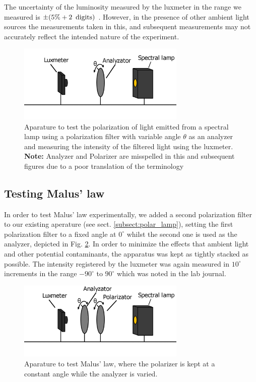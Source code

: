 \documentclass[11pt,a4paper, twocolumn]{article}
\begin{document}
    The uncertainty of the luminosity measured by the luxmeter in the range we measured is $\pm (5\% + 2\enspace \textup{digits})$ \cite{data:luxmeter}. However, in the presence of other ambient light sources the measurements taken in this, and subsequent measurements may not accurately reflect the intended nature of the experiment.


  \begin{figure}[H]
    \center
    \includegraphics[width=8cm]{scripts/figs/diagram_1.png}
    \caption{Aparature to test the polarization of light emitted from a spectral lamp using a polarization filter with variable angle $\theta$ as an analyzer and measuring the intensity of the filtered light using the luxmeter. \textbf{Note:} Analyzer and Polarizer are misspelled in this and subsequent figures due to a poor translation of the terminology}
    \label{fig:lux_ana_lamp}
  \end{figure}

  \subsection{Testing Malus' law}

    In order to test Malus' law experimentally, we added a second polarization filter to our existing aperature (see sect. \ref{subsect:polar_lamp}), setting the first polarization filter to a fixed angle at $0^\circ$ whilst the second one is used as the analyzer, depicted in Fig. \ref{fig:lux_ana_pola_lamp}. In order to minimize the effects that ambient light and other potential contaminants, the apparatus was kept as tightly stacked as possible. The intensity registered by the luxmeter was again measured in $10^\circ$ increments in the range $-90^\circ$ to $90^\circ$ which was noted in the lab journal. 

    \begin{figure}[H]
      \center
      \includegraphics[width=8cm]{scripts/figs/diagram_2.png}
      \caption{Aparature to test Malus' law, where the polarizer is kept at a constant angle while the analyzer is varied.}
      \label{fig:lux_ana_pola_lamp}
    \end{figure}
\end{document}
